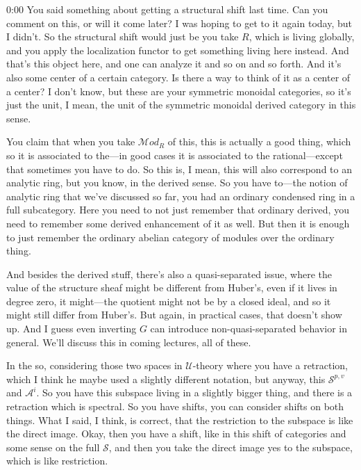 \begin{unfinished}{0:00}
You said something about getting a structural shift last time. Can you comment on this, or will it come later? I was hoping to get to it again today, but I didn't. So the structural shift would just be you take $R$, which is living globally, and you apply the localization functor to get something living here instead. And that's this object here, and one can analyze it and so on and so forth. And it's also some center of a certain category. Is there a way to think of it as a center of a center? I don't know, but these are your symmetric monoidal categories, so it's just the unit, I mean, the unit of the symmetric monoidal derived category in this sense.

You claim that when you take $\mathcal{M}od_R$ of this, this is actually a good thing, which so it is associated to the---in good cases it is associated to the rational---except that sometimes you have to do. So this is, I mean, this will also correspond to an analytic ring, but you know, in the derived sense. So you have to---the notion of analytic ring that we've discussed so far, you had an ordinary condensed ring in a full subcategory. Here you need to not just remember that ordinary derived, you need to remember some derived enhancement of it as well. But then it is enough to just remember the ordinary abelian category of modules over the ordinary thing.

And besides the derived stuff, there's also a quasi-separated issue, where the value of the structure sheaf might be different from Huber's, even if it lives in degree zero, it might---the quotient might not be by a closed ideal, and so it might still differ from Huber's. But again, in practical cases, that doesn't show up. And I guess even inverting $G$ can introduce non-quasi-separated behavior in general. We'll discuss this in coming lectures, all of these.

In the so, considering those two spaces in $\mathcal{U}$-theory where you have a retraction, which I think he maybe used a slightly different notation, but anyway, this $\mathcal{S}^{p,v}$ and $\mathcal{A}^{i}$. So you have this subspace living in a slightly bigger thing, and there is a retraction which is spectral. So you have shifts, you can consider shifts on both things. What I said, I think, is correct, that the restriction to the subspace is like the direct image. Okay, then you have a shift, like in this shift of categories and some sense on the full $\mathcal{S}$, and then you take the direct image yes to the subspace, which is like restriction.


\end{unfinished}
